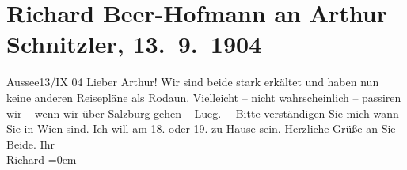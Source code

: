 

         
         \renewcommand{\erwaehntePersonen}{Personen: Paula Beer-Hofmann, Olga Schnitzler}
         \renewcommand{\erwaehnteOrte}{Orte: Bad Aussee, Lueg am Wolfgangsee, Rodaun, Salzburg, St. Gilgen, Wien}
         \renewcommand{\erwaehnteWerke}{}
               \section[Richard Beer-Hofmann an Arthur Schnitzler, 13. 9. 1904]{ Richard Beer-Hofmann an Arthur Schnitzler, 13. 9. 1904}\nopagebreak{}\rehead{ }\begin{ledgroupsized}[t]{13cm}\normalsize\beginnumbering \toendnotes[C]{\smallbreak\pagebreak[2]} 
\toendnotes[C]{\smallbreak}\pstart
           \centering{}{\pb}Aussee13/IX 04\pend
           \pstart
           Lieber Arthur! Wir sind beide stark erkältet und haben nun keine anderen Reisepläne
               als Rodaun. Vielleicht – nicht wahrscheinlich –
               passiren wir – wenn wir über Salzburg gehen – Lueg. – Bitte verständigen Sie mich wann Sie in
                  Wien sind. Ich will {\pb}am 18. oder
                  19. zu Hause sein.\pend
           \pstart
           Herzliche Grüße an Sie Beide.\pend
           \pstart
           Ihr{\\[\baselineskip]}\spacefill\mbox{Richard}\pend
           \leftskip=0em{}
         
         \endnumbering{}\end{ledgroupsized}  \newcommand{\dateiname}{L01443}\newcommand{\titel}{Richard Beer-Hofmann an Arthur Schnitzler, 13. 9. 1904}\newcommand{\editorInnen}{Martin Anton Müller und Gerd-Hermann Susen}
      
